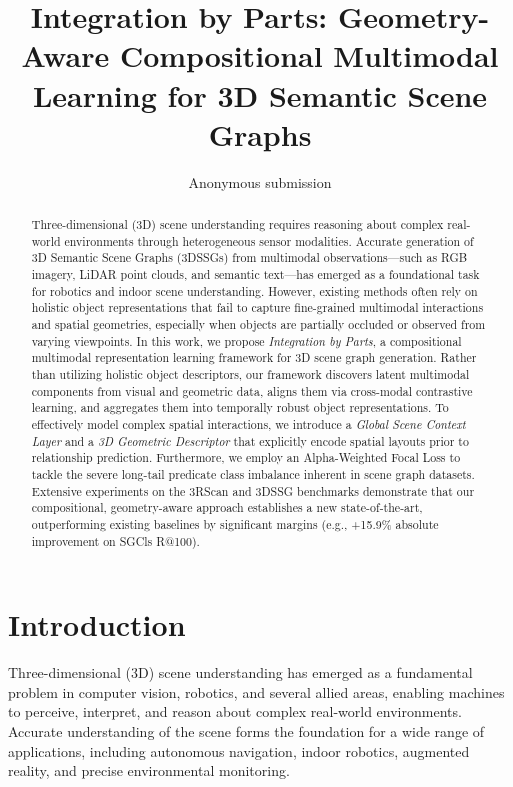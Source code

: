 \documentclass[letterpaper]{article}
\title{Integration by Parts: Geometry-Aware Compositional Multimodal Learning for 3D Semantic Scene Graphs}
\author{Anonymous submission}
\begin{document}
\maketitle

\begin{abstract}
Three-dimensional (3D) scene understanding requires reasoning about complex real-world environments through heterogeneous sensor modalities. Accurate generation of 3D Semantic Scene Graphs (3DSSGs) from multimodal observations—such as RGB imagery, LiDAR point clouds, and semantic text—has emerged as a foundational task for robotics and indoor scene understanding. However, existing methods often rely on holistic object representations that fail to capture fine-grained multimodal interactions and spatial geometries, especially when objects are partially occluded or observed from varying viewpoints. In this work, we propose \textit{Integration by Parts}, a compositional multimodal representation learning framework for 3D scene graph generation. Rather than utilizing holistic object descriptors, our framework discovers latent multimodal components from visual and geometric data, aligns them via cross-modal contrastive learning, and aggregates them into temporally robust object representations. To effectively model complex spatial interactions, we introduce a \textit{Global Scene Context Layer} and a \textit{3D Geometric Descriptor} that explicitly encode spatial layouts prior to relationship prediction. Furthermore, we employ an Alpha-Weighted Focal Loss to tackle the severe long-tail predicate class imbalance inherent in scene graph datasets. Extensive experiments on the 3RScan and 3DSSG benchmarks demonstrate that our compositional, geometry-aware approach establishes a new state-of-the-art, outperforming existing baselines by significant margins (e.g., +15.9\% absolute improvement on SGCls R@100).
\end{abstract}

\section{Introduction}
Three-dimensional (3D) scene understanding has emerged as a fundamental problem in computer vision, robotics, and several allied areas, enabling machines to perceive, interpret, and reason about complex real-world environments. Accurate understanding of the scene forms the foundation for a wide range of applications, including autonomous navigation, indoor robotics, augmented reality, and precise environmental monitoring. 
\end{document}
